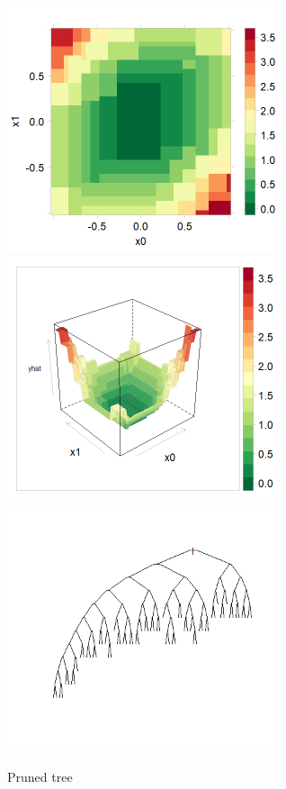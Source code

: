 \documentclass[10pt,openany]{article}
\numberwithin{definition}{section}
\numberwithin{example}{section}
\numberwithin{equation}{section}
\numberwithin{figure}{section}
\begin{document}
\begin{figure}
\noindent \begin{centering}
\includegraphics[width=80mm]{../fig/rpart-pruned-levelplot}~
\includegraphics[width=80mm]{../fig/rpart-pruned-wireframe}~
\includegraphics[width=80mm]{../fig/rpart-pruned-tree}
\par\end{centering}

\protect\caption{\label{fig:pruned-tree}Pruned tree}
\end{figure}
\end{document}
